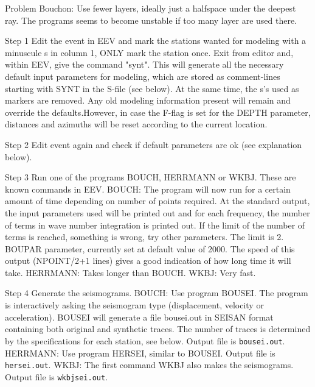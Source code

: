 Problem Bouchon: Use fewer layers, ideally just a halfspace under the deepest ray. The programs seems to become unstable if too many layer are used there. 

Step 1 \newline
Edit the event in EEV and mark the stations wanted for modeling with a minuscule s in column 1, ONLY mark the station once. Exit from editor and, within EEV, give the command "synt". This will generate all the necessary default input parameters for modeling, which are stored as comment-lines starting with SYNT in the S-file (see below). At the same time, the s's used as markers are removed. Any old modeling information present will remain and override the defaults.However, in case the F-flag is set for the DEPTH parameter, distances and azimuths will be reset according to the current location. 

Step 2 \newline
Edit event again and check if default parameters are ok (see explanation below).  

Step 3 \newline
Run one of the programs BOUCH, HERRMANN or WKBJ. These are known 
commands in EEV.  BOUCH: The program will now run for a certain 
amount of time depending on number of points required. At the standard 
output, the input parameters used will be printed out and for each 
frequency, the number of terms in wave number integration is printed 
out. If the limit of the number of terms is reached, something is 
wrong, try other parameters.
The limit is 2. BOUPAR parameter, currently set at default value of 2000. 
The speed of this output (NPOINT/2+1 lines) 
gives a good indication of how long time it will take. \newline
HERRMANN: Takes longer than BOUCH. \newline
WKBJ: Very fast. 

Step 4 \newline
Generate the seismograms. BOUCH: Use program BOUSEI. The program is 
interactively asking the seismogram type (displacement, velocity 
or acceleration). BOUSEI will generate a file bousei.out in SEISAN 
format containing both original and synthetic traces. The number 
of traces is determined by the specifications for each station, 
see below. Output file is \texttt{bousei.out}. \newline
HERRMANN: Use program HERSEI, similar to BOUSEI. Output file is \texttt{hersei.out}. 
\newline
WKBJ: The first command WKBJ also makes the seismograms. Output file is \texttt{wkbjsei.out}. 

